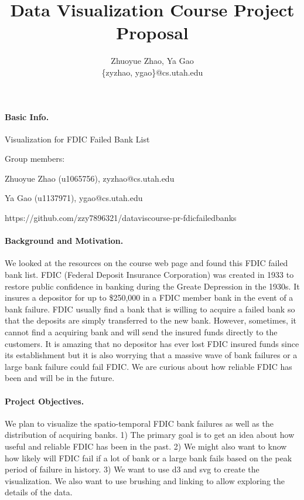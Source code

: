 \documentclass[11pt]{article}
\title{Data Visualization Course Project Proposal}
\author{Zhuoyue Zhao, Ya Gao\\\{zyzhao, ygao\}@cs.utah.edu}
\date{}
\begin{document}
\maketitle

\paragraph{Basic Info.} Visualization for FDIC Failed Bank List

Group members:

Zhuoyue Zhao (u1065756), zyzhao@cs.utah.edu

Ya Gao (u1137971), ygao@cs.utah.edu

https://github.com/zzy7896321/dataviscourse-pr-fdicfailedbanks


\paragraph{Background and Motivation.}

We looked at the resources on the course web page and found this FDIC failed
bank list. FDIC (Federal Deposit Insurance Corporation) was created in 1933
to restore public confidence in banking during the Greate Depression in the
1930s.  It insures a depositor for up to \$250,000 in a FDIC member bank in
the event of a bank failure. FDIC usually find a bank that is willing to
acquire a failed bank so that the deposits are simply transferred to the new
bank. However, sometimes, it cannot find a acquiring bank and will send the
insured funds directly to the customers. It is amazing that no depositor has
ever lost FDIC insured funds since its establishment but it is also worrying
that a massive wave of bank failures or a large bank failure could fail FDIC.
We are curious about how reliable FDIC has been and will be in the future.

\paragraph{Project Objectives.} 
We plan to visualize the spatio-temporal FDIC bank failures as well as the
distribution of acquiring banks. 1) The primary goal is to get an idea about
how useful and reliable FDIC has been in the past. 2) We might also want to
know how likely will FDIC fail if a lot of bank or a large bank fails based on
the peak period of failure in history. 3) We want to use d3 and svg to create
the visualization. We also want to use brushing and linking to allow exploring
the details of the data.
\end{document}
